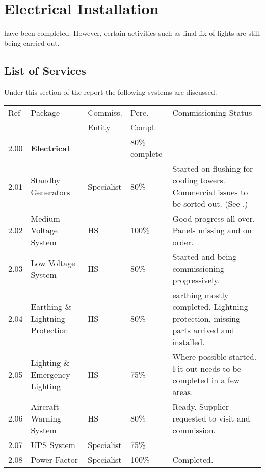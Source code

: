 \chapter{Electrical Installation}
\label{ch:electrical}

 have been completed. However, certain activities such as final fix of lights are still being carried out.  

\section{List of Services}
Under this section of the report the following systems are discussed.

\bgroup
\small
\label{chap:listofservices}

\begin{longtable}{llllp{4.2cm}}
\toprule
Ref	&Package	&Commiss.	&Perc. & Commissioning Status\\
     &         &Entity    &Compl.\\
\midrule
2.00	&\textbf{Electrical}		&& 80\% complete\\
2.01	&Standby Generators	&Specialist&80\% & Started on flushing for cooling towers. Commercial issues to be sorted out. (See {generators}.)\\	
2.02	&Medium Voltage System	&HS&100\% & Good progress all over. Panels missing and on order.\\	
2.03	&Low Voltage System		&HS&80\% & Started and being commissioning progressively.\\
2.04	&Earthing \& Lightning Protection &HS&80\% &earthing mostly completed. Lightning protection, missing parts arrived and installed. \\		
2.05	&Lighting \& Emergency Lighting  &HS&75\% & Where possible started. Fit-out needs to be completed in a few areas.\\		
2.06	&Aircraft Warning System &HS&80\% & Ready. Supplier requested to visit and commission. \\		
2.07	&UPS System	&Specialist& 75\% & \\	
2.08  &Power Factor  &Specialist &100\% & Completed.\\
\midrule
\end{longtable}
\egroup



